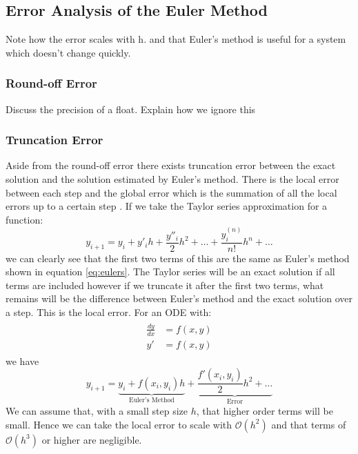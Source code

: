 \documentclass[reprint, amsmath, amssymb, aps]{revtex4-2}
\begin{document}
\subsection{Error Analysis of the Euler Method}
Note how the error scales with h. and that Euler's method is useful for a system which doesn't change quickly.

\subsubsection{Round-off Error}
Discuss the precision of a float. Explain how we ignore this

\subsubsection{Truncation Error}
Aside from the round-off error there exists truncation error between the exact solution and the solution estimated by Euler's method. There is the local error between each step and the global error which is the summation of all the local errors up to a certain step \cite{owkes}. If we take the Taylor series approximation for a function:
\begin{equation}
	y_{i+1} = y_{i} + y'_{i}h + \frac{y''_i}{2} h^2 + \dots + \frac{y_i^{(n)}}{n!} h^n + \dots
\end{equation}we can clearly see that the first two terms of this are the same as Euler's method shown in equation \ref{eq:eulers}. The Taylor series will be an exact solution if all terms are included however if we truncate it after the first two terms, what remains will be the difference between Euler's method and the exact solution over a step. This is the local error. For an ODE with:
\begin{align*}
	\begin{aligned}
	\frac{dy}{dx} &= f(x,y)\\
	y' &= f(x,y)
	\end{aligned}
\end{align*}we have
\begin{equation}
	y_{i+1} = \underbrace{y_i + f(x_i, y_i) h}_\text{Euler's Method} + \underbrace{\frac{f'(x_i,y_i)}{2}h^2 + \dots}_\text{Error}
\end{equation}We can assume that, with a small step size $h$, that higher order terms will be small. Hence we can take the local error to scale with $\mathcal{O}(h^2)$ and that terms of $\mathcal{O}(h^3)$ or higher are negligible.\\
\end{document}
